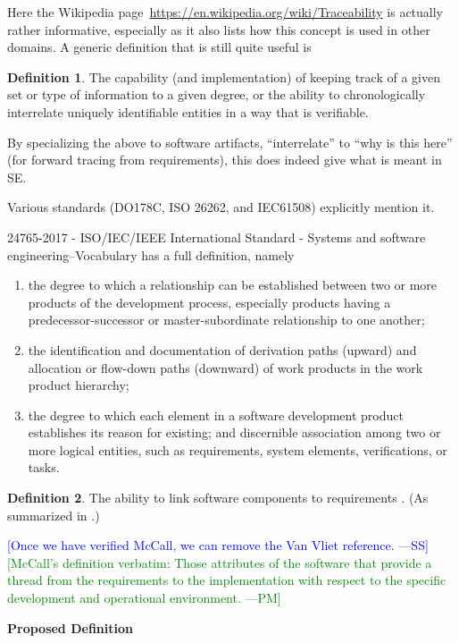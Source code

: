 \documentclass[letterpaper, cleveref]{lipics-v2019}
\newcommand{\authornote}[3]{\textcolor{#1}{[#3 ---#2]}}
\newcommand{\authornote}[3]{}
\newcommand{\wss}[1]{\authornote{blue}{SS}{#1}} %
\newcommand{\pmi}[1]{\authornote{green}{PM}{#1}} %
\theoremstyle{definition}
\newtheorem{defn}{Definition}
\begin{document}
Here the Wikipedia page~\url{https://en.wikipedia.org/wiki/Traceability} is
actually rather informative, especially as it also lists how this concept is
used in other domains.  A generic definition that is still quite useful is

\begin{defn}
  The capability (and implementation) of keeping track of a given set or
  type of information to a given degree, or the ability to chronologically
  interrelate uniquely identifiable entities in a way that is verifiable.
\end{defn}

By specializing the above to software artifacts, ``interrelate'' to ``why is
this here'' (for forward tracing from requirements), this does indeed give
what is meant in SE.

Various standards (DO178C, ISO 26262, and IEC61508) explicitly mention it.

24765-2017 - ISO/IEC/IEEE International Standard - Systems and software
engineering--Vocabulary has a full definition, namely
\begin{enumerate}
\item the degree to which a relationship can be established between two or more
  products of the development process, especially products having a
  predecessor-successor or master-subordinate relationship to one another;
\item the identification and documentation of derivation paths (upward) and
  allocation or flow-down paths (downward) of work products in the work product
  hierarchy;
\item the degree to which each element in a software development product
  establishes its reason for existing; and discernible association among two or
  more logical entities, such as requirements, system elements, verifications,
  or tasks.
\end{enumerate}

\begin{defn}
  The ability to link software components to requirements
  \citep{McCallEtAl1977}. (As summarized in \citet{VanVliet2000}.)
\end{defn} \wss{Once we have verified McCall, we can remove the Van Vliet
reference.}  \pmi{McCall's definition verbatim: Those attributes of the
software that provide a thread from the requirements to the implementation
with respect to the specific development and operational environment.}

\noindent \textbf{Proposed Definition} 
\end{document}
